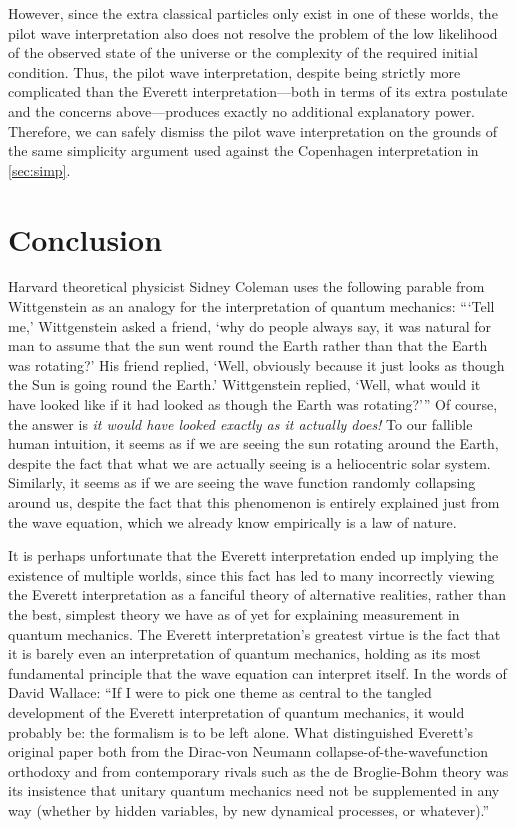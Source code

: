 \documentclass[
    12pt,
    letterpaper,
    aps,
    prd,
    longbibliography,
    twocolumn,
    nofootinbib,
    raggedbottom,
    amsmath,
    amssymb,
    amsfonts,
]{revtex4-1}
\begin{document}
However, since the extra classical particles only exist in one of these worlds, the pilot wave interpretation also does not resolve the problem of the low likelihood of the observed state of the universe\cite{falsification} or the complexity of the required initial condition\cite{arrowoftime}. Thus, the pilot wave interpretation, despite being strictly more complicated than the Everett interpretation---both in terms of its extra postulate and the concerns above---produces exactly no additional explanatory power. Therefore, we can safely dismiss the pilot wave interpretation on the grounds of the same simplicity argument used against the Copenhagen interpretation in \autoref{sec:simp}.

\section{Conclusion}

Harvard theoretical physicist Sidney Coleman uses the following parable from Wittgenstein as an analogy for the interpretation of quantum mechanics: ```Tell me,' Wittgenstein asked a friend, `why do people always say, it was natural for man to assume that the sun went round the Earth rather than that the Earth was rotating?' His friend replied, `Well, obviously because it just looks as though the Sun is going round the Earth.' Wittgenstein replied, `Well, what would it have looked like if it had looked as though the Earth was rotating?'''\cite{inyourface} Of course, the answer is \textit{it would have looked exactly as it actually does!} To our fallible human intuition, it seems as if we are seeing the sun rotating around the Earth, despite the fact that what we are actually seeing is a heliocentric solar system. Similarly, it seems as if we are seeing the wave function randomly collapsing around us, despite the fact that this phenomenon is entirely explained just from the wave equation, which we already know empirically is a law of nature.

It is perhaps unfortunate that the Everett interpretation ended up implying the existence of multiple worlds, since this fact has led to many incorrectly viewing the Everett interpretation as a fanciful theory of alternative realities, rather than the best, simplest theory we have as of yet for explaining measurement in quantum mechanics. The Everett interpretation's greatest virtue is the fact that it is barely even an interpretation of quantum mechanics, holding as its most fundamental principle that the wave equation can interpret itself. In the words of David Wallace: ``If I were to pick one theme as central to the tangled development of the Everett interpretation of quantum mechanics, it would probably be: the formalism is to be left alone. What distinguished Everett’s original paper both from the Dirac-von Neumann collapse-of-the-wavefunction orthodoxy and from contemporary rivals such as the de Broglie-Bohm theory was its insistence that unitary quantum mechanics need not be supplemented in any way (whether by hidden variables, by new dynamical processes, or whatever).''\cite{bornproof2}
\end{document}
